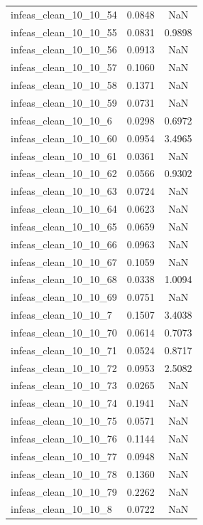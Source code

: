 \begin{longtable}{lcc}
infeas\_clean\_10\_10\_54  &   0.0848 &     NaN \\
infeas\_clean\_10\_10\_55  &   0.0831 &  0.9898 \\
infeas\_clean\_10\_10\_56  &   0.0913 &     NaN \\
infeas\_clean\_10\_10\_57  &   0.1060 &     NaN \\
infeas\_clean\_10\_10\_58  &   0.1371 &     NaN \\
infeas\_clean\_10\_10\_59  &   0.0731 &     NaN \\
infeas\_clean\_10\_10\_6   &   0.0298 &  0.6972 \\
infeas\_clean\_10\_10\_60  &   0.0954 &  3.4965 \\
infeas\_clean\_10\_10\_61  &   0.0361 &     NaN \\
infeas\_clean\_10\_10\_62  &   0.0566 &  0.9302 \\
infeas\_clean\_10\_10\_63  &   0.0724 &     NaN \\
infeas\_clean\_10\_10\_64  &   0.0623 &     NaN \\
infeas\_clean\_10\_10\_65  &   0.0659 &     NaN \\
infeas\_clean\_10\_10\_66  &   0.0963 &     NaN \\
infeas\_clean\_10\_10\_67  &   0.1059 &     NaN \\
infeas\_clean\_10\_10\_68  &   0.0338 &  1.0094 \\
infeas\_clean\_10\_10\_69  &   0.0751 &     NaN \\
infeas\_clean\_10\_10\_7   &   0.1507 &  3.4038 \\
infeas\_clean\_10\_10\_70  &   0.0614 &  0.7073 \\
infeas\_clean\_10\_10\_71  &   0.0524 &  0.8717 \\
infeas\_clean\_10\_10\_72  &   0.0953 &  2.5082 \\
infeas\_clean\_10\_10\_73  &   0.0265 &     NaN \\
infeas\_clean\_10\_10\_74  &   0.1941 &     NaN \\
infeas\_clean\_10\_10\_75  &   0.0571 &     NaN \\
infeas\_clean\_10\_10\_76  &   0.1144 &     NaN \\
infeas\_clean\_10\_10\_77  &   0.0948 &     NaN \\
infeas\_clean\_10\_10\_78  &   0.1360 &     NaN \\
infeas\_clean\_10\_10\_79  &   0.2262 &     NaN \\
infeas\_clean\_10\_10\_8   &   0.0722 &     NaN \\

\end{longtable}
